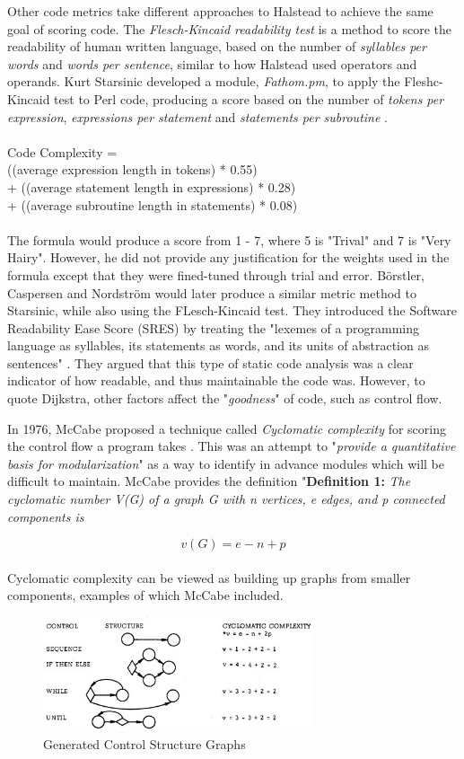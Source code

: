 \documentclass[manuscript,screen,review,sigconf]{acmart}
\begin{document}
Other code metrics take different approaches to Halstead to achieve the same goal of scoring code. The \textit{Flesch-Kincaid readability test} \cite{FleschReading} is a method to score the readability of human written language, based on the number of \textit{syllables per words} and \textit{words per sentence}, similar to how Halstead used operators and operands. Kurt Starsinic developed a module, \textit{Fathom.pm}, to apply the Fleshc-Kincaid test to Perl code, producing a score based on the number of \textit{{}tokens per expression}, \textit{expressions per statement} and \textit{statements per subroutine} \cite{Starsinic_1998}.
\\ \\
Code Complexity =\\
  ((average expression length in tokens) * 0.55)\\
+ ((average statement length in expressions) * 0.28)\\
+ ((average subroutine length in statements) * 0.08)\\
\\
The formula would produce a score from 1 - 7, where 5 is "Trival" and 7 is "Very Hairy".  However, he did not provide any justification for the weights used in the formula except that they were fined-tuned through trial and error.
Börstler, Caspersen and Nordström would later produce a similar metric method to Starsinic, while also using the FLesch-Kincaid test. They introduced the Software Readability Ease Score (SRES) by treating the "lexemes of a programming language as syllables, its statements as words, and its units of abstraction as sentences" \cite{borstler2007beauty}. They argued that this type of static code analysis was a clear indicator of how readable, and thus maintainable the code was. However, to quote Dijkstra, other factors affect the "\textit{goodness}" of code, such as control flow.

In 1976, McCabe proposed a technique called \textit{Cyclomatic complexity} for scoring the control flow a program takes \cite{A_Complexity_Measure}. This was an attempt to "\textit{provide a quantitative basis for modularization}" as a way to identify in advance modules which will be difficult to maintain. McCabe provides the definition
"\textbf{Definition 1:} \textit{The cyclomatic number V(G) of a graph G
with n vertices, e edges, and p connected components is}

\[v(G)=e- n+p\]
\\
Cyclomatic complexity can be viewed as building up graphs from smaller components, examples of which McCabe included.
\begin{figure}[h]
    \includegraphics[width=8cm]{controlFlowDia.jpg}
    \caption{Generated Control Structure Graphs \cite{A_Complexity_Measure}}
    \label{fig:CC Graphs}
    \centering
\end{figure}
\end{document}
